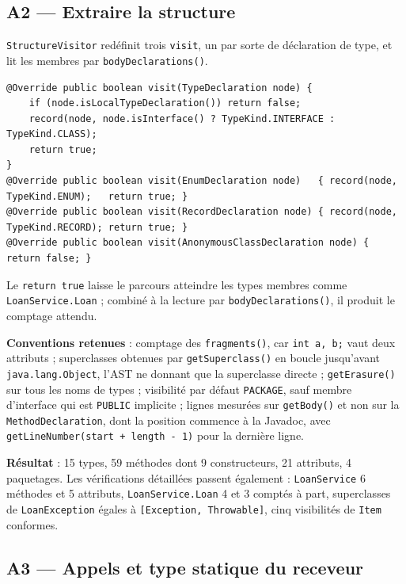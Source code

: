 \documentclass[11pt,a4paper]{article}
\begin{document}
\subsection{A2 --- Extraire la structure}

\texttt{StructureVisitor} redéfinit trois \texttt{visit}, un par sorte de déclaration de type, et lit les membres par \texttt{bodyDeclarations()}.

\begin{lstlisting}
@Override public boolean visit(TypeDeclaration node) {
    if (node.isLocalTypeDeclaration()) return false;
    record(node, node.isInterface() ? TypeKind.INTERFACE : TypeKind.CLASS);
    return true;
}
@Override public boolean visit(EnumDeclaration node)   { record(node, TypeKind.ENUM);   return true; }
@Override public boolean visit(RecordDeclaration node) { record(node, TypeKind.RECORD); return true; }
@Override public boolean visit(AnonymousClassDeclaration node) { return false; }
\end{lstlisting}

Le \texttt{return true} laisse le parcours atteindre les types membres comme \texttt{LoanService.Loan} ; combiné à la lecture par \texttt{bodyDeclarations()}, il produit le comptage attendu.

\textbf{Conventions retenues} : comptage des \texttt{fragments()}, car \texttt{int a, b;} vaut deux attributs ; superclasses obtenues par \texttt{getSuperclass()} en boucle jusqu'avant \texttt{java.lang.Object}, l'AST ne donnant que la superclasse directe ; \texttt{getErasure()} sur tous les noms de types ; visibilité par défaut \texttt{PACKAGE}, sauf membre d'interface qui est \texttt{PUBLIC} implicite ; lignes mesurées sur \texttt{getBody()} et non sur la \texttt{MethodDeclaration}, dont la position commence à la Javadoc, avec \texttt{getLineNumber(start + length - 1)} pour la dernière ligne.

\textbf{Résultat} : 15 types, 59 méthodes dont 9 constructeurs, 21 attributs, 4 paquetages. Les vérifications détaillées passent également : \texttt{LoanService} 6 méthodes et 5 attributs, \texttt{LoanService.Loan} 4 et 3 comptés à part, superclasses de \texttt{LoanException} égales à \texttt{[Exception, Throwable]}, cinq visibilités de \texttt{Item} conformes.

\subsection{A3 --- Appels et type statique du receveur}
\end{document}
